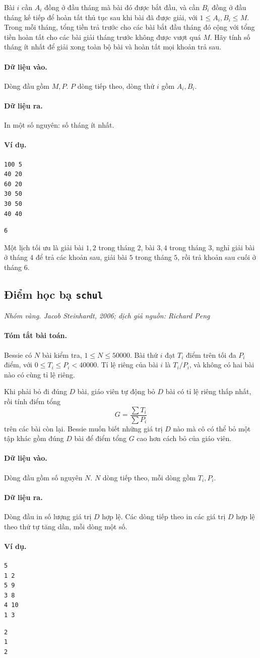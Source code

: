 \documentclass[11pt]{article}
\newcommand{\problem}[4]{%
  \subsection[#1 (#2)]{#1 \hfill {\normalsize\texttt{#2}}}%
  \noindent\textit{#3. #4}\par\smallskip
}
\newcommand{\iosec}[1]{\paragraph{#1}}
\begin{document}
Bài \(i\) cần \(A_i\) đồng ở đầu tháng mà bài đó được bắt đầu, và cần
\(B_i\) đồng ở đầu tháng kế tiếp để hoàn tất thủ tục sau khi bài đã được giải,
với \(1\le A_i,B_i\le M\). Trong mỗi tháng, tổng tiền trả trước cho các bài
bắt đầu tháng đó cộng với tổng tiền hoàn tất cho các bài giải tháng trước
không được vượt quá \(M\). Hãy tính số tháng ít nhất để giải xong toàn bộ bài
và hoàn tất mọi khoản trả sau.

\iosec{Dữ liệu vào.}
Dòng đầu gồm \(M,P\). \(P\) dòng tiếp theo, dòng thứ \(i\) gồm \(A_i,B_i\).

\iosec{Dữ liệu ra.}
In một số nguyên: số tháng ít nhất.

\iosec{Ví dụ.}
\begin{verbatim}
100 5
40 20
60 20
30 50
30 50
40 40
\end{verbatim}

\begin{verbatim}
6
\end{verbatim}

Một lịch tối ưu là giải bài \(1,2\) trong tháng \(2\), bài \(3,4\) trong
tháng \(3\), nghỉ giải bài ở tháng \(4\) để trả các khoản sau, giải bài \(5\)
trong tháng \(5\), rồi trả khoản sau cuối ở tháng \(6\).

\problem{Điểm học bạ}{schul}{Nhóm vàng}{Jacob Steinhardt, 2006; dịch giả nguồn: Richard Peng}

\iosec{Tóm tắt bài toán.}
Bessie có \(N\) bài kiểm tra, \(1\le N\le 50000\). Bài thứ \(i\) đạt
\(T_i\) điểm trên tối đa \(P_i\) điểm, với \(0\le T_i\le P_i<40000\). Tỉ lệ
riêng của bài \(i\) là \(T_i/P_i\), và không có hai bài nào có cùng tỉ lệ
riêng.

Khi phải bỏ đi đúng \(D\) bài, giáo viên tự động bỏ \(D\) bài có tỉ lệ riêng
thấp nhất, rồi tính điểm tổng
\[
  G=\frac{\sum T_i}{\sum P_i}
\]
trên các bài còn lại. Bessie muốn biết những giá trị \(D\) nào mà cô có thể
bỏ một tập khác gồm đúng \(D\) bài để điểm tổng \(G\) cao hơn cách bỏ của
giáo viên.

\iosec{Dữ liệu vào.}
Dòng đầu gồm số nguyên \(N\). \(N\) dòng tiếp theo, mỗi dòng gồm \(T_i,P_i\).

\iosec{Dữ liệu ra.}
Dòng đầu in số lượng giá trị \(D\) hợp lệ. Các dòng tiếp theo in các giá trị
\(D\) hợp lệ theo thứ tự tăng dần, mỗi dòng một số.

\iosec{Ví dụ.}
\begin{verbatim}
5
1 2
5 9
3 8
4 10
1 3
\end{verbatim}

\begin{verbatim}
2
1
2
\end{verbatim}
\end{document}
